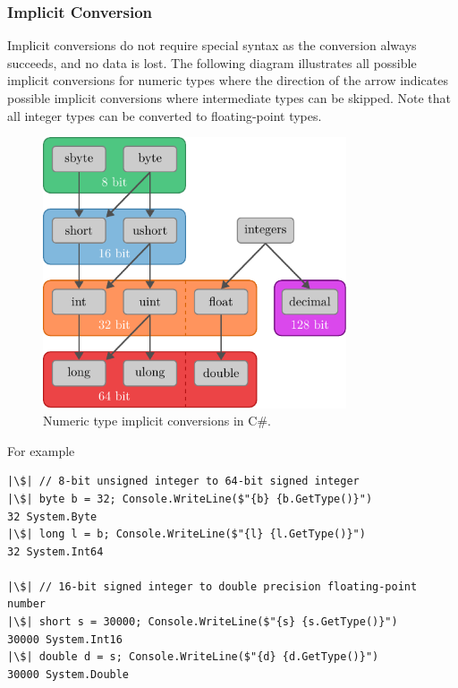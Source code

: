 \documentclass{article}
\begin{document}
\subsubsection{Implicit Conversion}
Implicit conversions do not require special syntax as the conversion
always succeeds, and no data is lost. The following diagram illustrates
all possible implicit conversions for numeric types where the direction
of the arrow indicates possible implicit conversions where intermediate
types can be skipped. Note that all integer types can be converted to
floating-point types.
\begin{figure}[H]
    \centering
    \includegraphics[height = 8cm, keepaspectratio = true]{figures/implicit_conversions.pdf}
    \caption{Numeric type implicit conversions in C\#.}
\end{figure}
For example
\begin{verbatim}
|\$| // 8-bit unsigned integer to 64-bit signed integer
|\$| byte b = 32; Console.WriteLine($"{b} {b.GetType()}")
32 System.Byte
|\$| long l = b; Console.WriteLine($"{l} {l.GetType()}")
32 System.Int64

|\$| // 16-bit signed integer to double precision floating-point number
|\$| short s = 30000; Console.WriteLine($"{s} {s.GetType()}")
30000 System.Int16
|\$| double d = s; Console.WriteLine($"{d} {d.GetType()}")
30000 System.Double
\end{verbatim}
\end{document}
